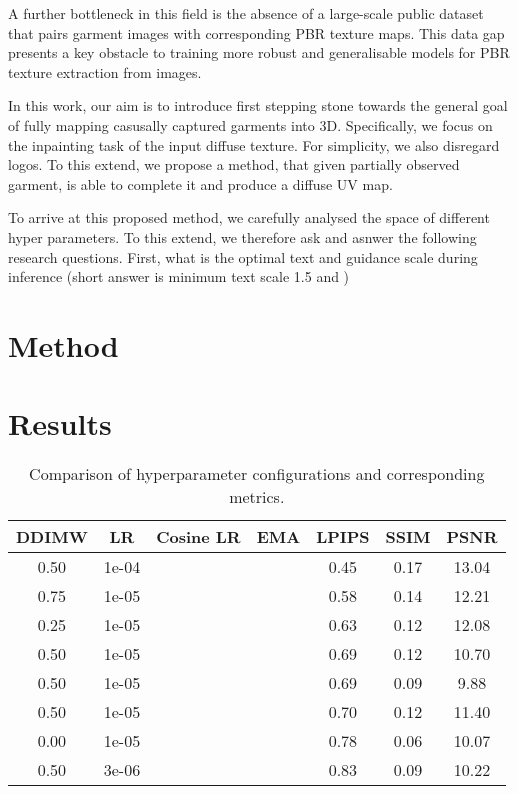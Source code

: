 \documentclass[11pt]{article}
\newcommand{\cmark}{\checkmark}
\newcommand{\xmark}{\ding{55}}
\begin{document}
A further bottleneck in this field is the absence of a large-scale public dataset that pairs garment images with corresponding PBR texture maps. This data gap presents a key obstacle to training more robust and generalisable models for PBR texture extraction from images.

In this work, our aim is to introduce first stepping stone towards the general goal of fully mapping casusally captured
garments into 3D. Specifically, we focus on the inpainting task of the input diffuse texture. For simplicity, we also disregard logos.
To this extend, we propose a method, that given partially observed garment, is able to complete it and produce a diffuse UV map.


To arrive at this proposed method, we carefully analysed the space of different hyper parameters. To this extend,
we therefore ask and asnwer the following research questions. First, what is the optimal text and guidance scale
during inference (short answer is minimum text scale 1.5 and )

\section{Method}

\section{Results}

\begin{table}[ht]
  \centering
  \begin{tabular}{cccc|ccc}
  \toprule
  \textbf{DDIMW} & \textbf{LR} & \textbf{Cosine LR} & \textbf{EMA} & \textbf{LPIPS} & \textbf{SSIM} & \textbf{PSNR} \\
  \midrule
  0.50 & 1e-04 & \xmark & \xmark & 0.45 & 0.17 & 13.04 \\
  0.75 & 1e-05 & \xmark & \xmark & 0.58 & 0.14 & 12.21 \\
  0.25 & 1e-05 & \xmark & \xmark & 0.63 & 0.12 & 12.08 \\
  0.50 & 1e-05 & \cmark & \xmark & 0.69 & 0.12 & 10.70 \\
  0.50 & 1e-05 & \xmark & \xmark & 0.69 & 0.09 & 9.88 \\
  0.50 & 1e-05 & \xmark & \cmark & 0.70 & 0.12 & 11.40 \\
  0.00 & 1e-05 & \xmark & \xmark & 0.78 & 0.06 & 10.07 \\
  0.50 & 3e-06 & \xmark & \xmark & 0.83 & 0.09 & 10.22 \\
  \bottomrule
  \end{tabular}
  \caption{Comparison of hyperparameter configurations and corresponding metrics.}
  \label{tab:hyperparams}
  \end{table}
\end{document}
